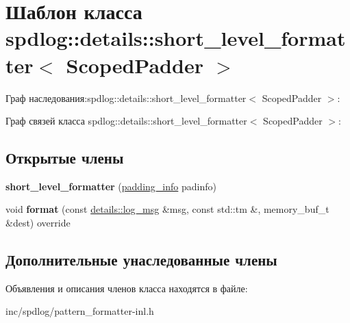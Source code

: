 \hypertarget{classspdlog_1_1details_1_1short__level__formatter}{}\section{Шаблон класса spdlog\+:\+:details\+:\+:short\+\_\+level\+\_\+formatter$<$ Scoped\+Padder $>$}
\label{classspdlog_1_1details_1_1short__level__formatter}


Граф наследования\+:spdlog\+:\+:details\+:\+:short\+\_\+level\+\_\+formatter$<$ Scoped\+Padder $>$\+:


Граф связей класса spdlog\+:\+:details\+:\+:short\+\_\+level\+\_\+formatter$<$ Scoped\+Padder $>$\+:
\subsection*{Открытые члены}
\begin{DoxyCompactItemize}
\item 
\mbox{\label{classspdlog_1_1details_1_1short__level__formatter_a032f832473705767d44fcac63d1f2ba8}} 
{\bfseries short\+\_\+level\+\_\+formatter} (\hyperlink{structspdlog_1_1details_1_1padding__info}{padding\+\_\+info} padinfo)
\item 
\mbox{\label{classspdlog_1_1details_1_1short__level__formatter_ab936960c134c830d7adad7a8cb554166}} 
void {\bfseries format} (const \hyperlink{structspdlog_1_1details_1_1log__msg}{details\+::log\+\_\+msg} \&msg, const std\+::tm \&, memory\+\_\+buf\+\_\+t \&dest) override
\end{DoxyCompactItemize}
\subsection*{Дополнительные унаследованные члены}


Объявления и описания членов класса находятся в файле\+:\begin{DoxyCompactItemize}
\item 
inc/spdlog/pattern\+\_\+formatter-\/inl.\+h\end{DoxyCompactItemize}
